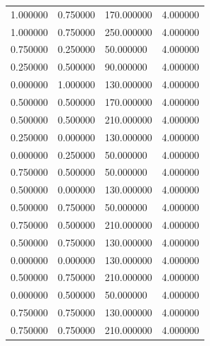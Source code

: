 \documentclass[12pt]{report}
\begin{document}
\begin{table}[h!]
\begin{center}
\begin{tabular}{|llll|}
			1.000000                      & 0.750000                   & 170.000000                & 4.000000 \\
			1.000000                      & 0.750000                   & 250.000000                & 4.000000 \\
			0.750000                      & 0.250000                   & 50.000000                 & 4.000000 \\
			0.250000                      & 0.500000                   & 90.000000                 & 4.000000 \\
			0.000000                      & 1.000000                   & 130.000000                & 4.000000 \\
			0.500000                      & 0.500000                   & 170.000000                & 4.000000 \\
			0.500000                      & 0.500000                   & 210.000000                & 4.000000 \\
			0.250000                      & 0.000000                   & 130.000000                & 4.000000 \\
			0.000000                      & 0.250000                   & 50.000000                 & 4.000000 \\
			0.750000                      & 0.500000                   & 50.000000                 & 4.000000 \\
			0.500000                      & 0.000000                   & 130.000000                & 4.000000 \\
			0.500000                      & 0.750000                   & 50.000000                 & 4.000000 \\
			0.750000                      & 0.500000                   & 210.000000                & 4.000000 \\
			0.500000                      & 0.750000                   & 130.000000                & 4.000000 \\
			0.000000                      & 0.000000                   & 130.000000                & 4.000000 \\
			0.500000                      & 0.750000                   & 210.000000                & 4.000000 \\
			0.000000                      & 0.500000                   & 50.000000                 & 4.000000 \\
			0.750000                      & 0.750000                   & 130.000000                & 4.000000 \\
			0.750000                      & 0.750000                   & 210.000000                & 4.000000 \\

\end{tabular}
\end{center}
\end{table}
\end{document}
